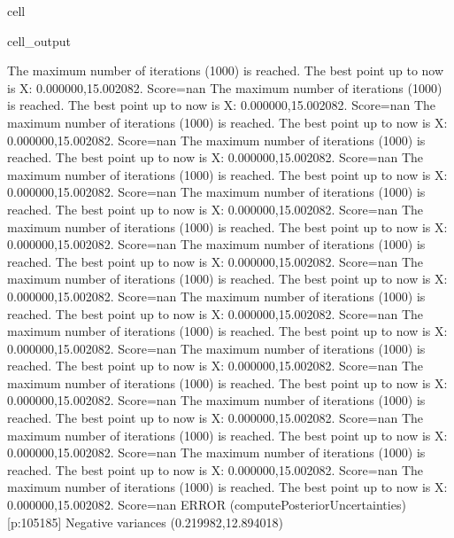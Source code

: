 \documentclass[letterpaper,10pt,english]{jupyterBook}
\begin{document}
\begin{sphinxuseclass}{cell}
\begin{sphinxVerbatimOutput}
\begin{sphinxuseclass}{cell_output}
\begin{sphinxVerbatim}[commandchars=\\\{\}]
The maximum number of iterations (1000) is reached. The best point up to now is X: \PYGZob{}0.000000,15.002082\PYGZcb{}. Score=\PYGZhy{}nan
The maximum number of iterations (1000) is reached. The best point up to now is X: \PYGZob{}0.000000,15.002082\PYGZcb{}. Score=\PYGZhy{}nan
The maximum number of iterations (1000) is reached. The best point up to now is X: \PYGZob{}0.000000,15.002082\PYGZcb{}. Score=\PYGZhy{}nan
The maximum number of iterations (1000) is reached. The best point up to now is X: \PYGZob{}0.000000,15.002082\PYGZcb{}. Score=\PYGZhy{}nan
The maximum number of iterations (1000) is reached. The best point up to now is X: \PYGZob{}0.000000,15.002082\PYGZcb{}. Score=\PYGZhy{}nan
The maximum number of iterations (1000) is reached. The best point up to now is X: \PYGZob{}0.000000,15.002082\PYGZcb{}. Score=\PYGZhy{}nan
The maximum number of iterations (1000) is reached. The best point up to now is X: \PYGZob{}0.000000,15.002082\PYGZcb{}. Score=\PYGZhy{}nan
The maximum number of iterations (1000) is reached. The best point up to now is X: \PYGZob{}0.000000,15.002082\PYGZcb{}. Score=\PYGZhy{}nan
The maximum number of iterations (1000) is reached. The best point up to now is X: \PYGZob{}0.000000,15.002082\PYGZcb{}. Score=\PYGZhy{}nan
The maximum number of iterations (1000) is reached. The best point up to now is X: \PYGZob{}0.000000,15.002082\PYGZcb{}. Score=\PYGZhy{}nan
The maximum number of iterations (1000) is reached. The best point up to now is X: \PYGZob{}0.000000,15.002082\PYGZcb{}. Score=\PYGZhy{}nan
The maximum number of iterations (1000) is reached. The best point up to now is X: \PYGZob{}0.000000,15.002082\PYGZcb{}. Score=\PYGZhy{}nan
The maximum number of iterations (1000) is reached. The best point up to now is X: \PYGZob{}0.000000,15.002082\PYGZcb{}. Score=\PYGZhy{}nan
The maximum number of iterations (1000) is reached. The best point up to now is X: \PYGZob{}0.000000,15.002082\PYGZcb{}. Score=\PYGZhy{}nan
The maximum number of iterations (1000) is reached. The best point up to now is X: \PYGZob{}0.000000,15.002082\PYGZcb{}. Score=\PYGZhy{}nan
The maximum number of iterations (1000) is reached. The best point up to now is X: \PYGZob{}0.000000,15.002082\PYGZcb{}. Score=\PYGZhy{}nan
The maximum number of iterations (1000) is reached. The best point up to now is X: \PYGZob{}0.000000,15.002082\PYGZcb{}. Score=\PYGZhy{}nan
ERROR (compute\PYGZus{}Posterior\PYGZus{}Uncertainties) [p:105185] Negative variances (\PYGZhy{}0.219982,12.894018)

\end{sphinxVerbatim}
\end{sphinxuseclass}
\end{sphinxVerbatimOutput}
\end{sphinxuseclass}
\end{document}
